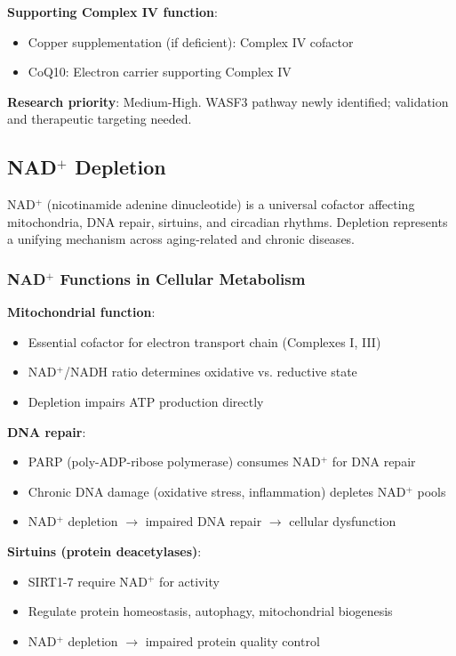 \textbf{Supporting Complex IV function}:
\begin{itemize}
    \item Copper supplementation (if deficient): Complex IV cofactor
    \item CoQ10: Electron carrier supporting Complex IV
\end{itemize}

\textbf{Research priority}: Medium-High. WASF3 pathway newly identified; validation and therapeutic targeting needed.

\subsection{NAD$^+$ Depletion}
\label{sec:nad-translational}

NAD$^+$ (nicotinamide adenine dinucleotide) is a universal cofactor affecting mitochondria, DNA repair, sirtuins, and circadian rhythms. Depletion represents a unifying mechanism across aging-related and chronic diseases.

\subsubsection{NAD$^+$ Functions in Cellular Metabolism}

\textbf{Mitochondrial function}:
\begin{itemize}
    \item Essential cofactor for electron transport chain (Complexes I, III)
    \item NAD$^+$/NADH ratio determines oxidative vs. reductive state
    \item Depletion impairs ATP production directly
\end{itemize}

\textbf{DNA repair}:
\begin{itemize}
    \item PARP (poly-ADP-ribose polymerase) consumes NAD$^+$ for DNA repair
    \item Chronic DNA damage (oxidative stress, inflammation) depletes NAD$^+$ pools
    \item NAD$^+$ depletion $\rightarrow$ impaired DNA repair $\rightarrow$ cellular dysfunction
\end{itemize}

\textbf{Sirtuins (protein deacetylases)}:
\begin{itemize}
    \item SIRT1-7 require NAD$^+$ for activity
    \item Regulate protein homeostasis, autophagy, mitochondrial biogenesis
    \item NAD$^+$ depletion $\rightarrow$ impaired protein quality control
\end{itemize}

